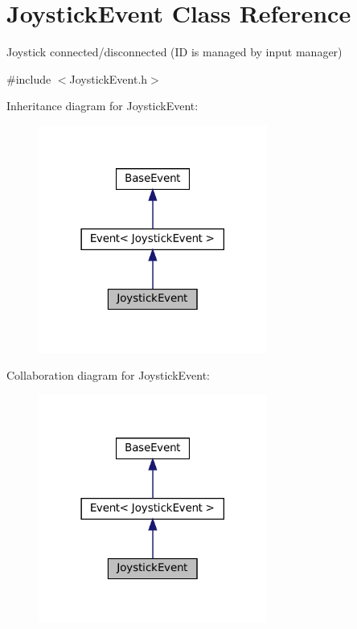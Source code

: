 \hypertarget{classJoystickEvent}{}\section{Joystick\+Event Class Reference}
\label{classJoystickEvent}


Joystick connected/disconnected (ID is managed by input manager)  




{\ttfamily \#include $<$Joystick\+Event.\+h$>$}



Inheritance diagram for Joystick\+Event\+:\nopagebreak
\begin{figure}[H]
\begin{center}
\leavevmode
\includegraphics[width=213pt]{classJoystickEvent__inherit__graph}
\end{center}
\end{figure}


Collaboration diagram for Joystick\+Event\+:\nopagebreak
\begin{figure}[H]
\begin{center}
\leavevmode
\includegraphics[width=213pt]{classJoystickEvent__coll__graph}
\end{center}
\end{figure}
